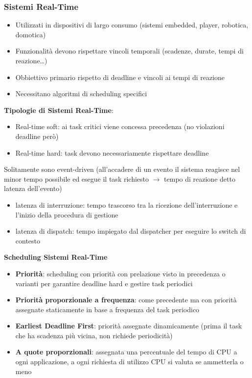 \documentclass{article}
\begin{document}
\subsubsection{Sistemi Real-Time}
\begin{itemize}
    \item Utilizzati in dispositivi di largo consumo (sistemi embedded, player, robotica, domotica)
    \item Funzionalità devono rispettare vincoli temporali (scadenze, durate, tempi di reazione…)
    \item Obbiettivo primario rispetto di deadline e vincoli ai tempi di reazione
    \item Necessitano algoritmi di scheduling specifici
\end{itemize}
\textbf{Tipologie di Sistemi Real-Time}:
\begin{itemize}
    \item Real-time soft: ai task critici viene concessa precedenza (no violazioni deadline però)
    \item Real-time hard: task devono necessariamente rispettare deadline
\end{itemize}
Solitamente sono event-driven (all’accadere di un evento il sistema reagisce nel minor tempo possibile ed esegue il task richiesto $\rightarrow$ tempo di reazione detto latenza dell’evento)
\begin{itemize}
    \item latenza di interruzione: tempo trascorso tra la ricezione dell’interruzione e l’inizio della procedura di gestione
    \item latenza di dispatch: tempo impiegato dal dispatcher per eseguire lo switch di contesto
\end{itemize}
\textbf{Scheduling Sistemi Real-Time}
\begin{itemize}
    \item \textbf{Priorità}: scheduling con priorità con prelazione visto in precedenza o varianti per garantire deadline hard e gestire task periodici
    \item \textbf{Priorità proporzionale a frequenza}: come precedente ma con priorità assegnate staticamente in base a frequenza del task periodico
    \item \textbf{Earliest Deadline First}: priorità assegnate dinamicamente (prima il task che ha scadenza più vicina, non richiede periodicità)
    \item \textbf{A quote proporzionali}: assegnata una percentuale del tempo di CPU a ogni applicazione, a ogni richiesta di utilizzo CPU si valuta se ammetterla o meno
\end{itemize}
\end{document}
